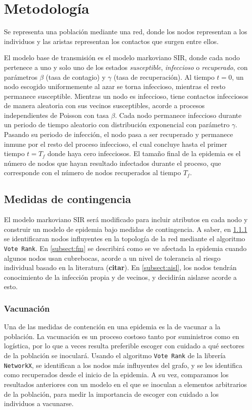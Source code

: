 \chapter{Metodología}\label{ch:method}

Se representa una población mediante una red, donde los nodos representan a los individuos y las aristas representan los contactos que surgen entre ellos. 

El modelo base de transmisión es el modelo markoviano SIR, donde cada nodo pertenece a uno y solo uno de los estados \textit{susceptible}, \textit{infeccioso} o \textit{recuperado}, con parámetros $\beta$ (tasa de contagio) y $\gamma$ (tasa de recuperación). Al tiempo $t = 0$, un nodo escogido uniformemente al azar se torna infeccioso, mientras el resto permanece susceptible. Mientras un nodo es infeccioso, tiene contactos infecciosos de manera aleatoria con sus vecinos susceptibles, acorde a procesos independientes de Poisson con tasa $\beta$. Cada nodo permanece infeccioso durante un periodo de tiempo aleatorio con distribución exponencial con parámetro $\gamma$. Pasando su periodo de infección, el nodo pasa a ser recuperado y permanece inmune por el resto del proceso infeccioso, el cual concluye hasta el primer tiempo $t = T_f$ donde haya cero infecciosos. El tamaño final de la epidemia es el número de nodos que hayan resultado infectados durante el proceso, que corresponde con el número de nodos recuperados al tiempo $T_f$. 

\section{Medidas de contingencia}
El modelo markoviano SIR será modificado para incluir atributos en cada nodo y construir un modelo de epidemia bajo medidas de contingencia.  A saber, en \ref{subsect:vacc} se identificaran nodos influyentes en la topología de la red mediante el algoritmo \texttt{Vote Rank}. En \ref{subsect:fm} se describirá como se ve afectada la epidemia cuando algunos nodos usan cubrebocas, acorde a un nivel de tolerancia al riesgo individual basado en la literatura (\textbf{citar}). En \ref{subsect:aisl}, los nodos tendrán conocimiento de la infección propia y de vecinos, y decidirán aislarse acorde a esto. 

\subsection{Vacunación}\label{subsect:vacc}
Una de las medidas de contención en una epidemia es la de vacunar a la población. La vacunación es un proceso costoso tanto por suministros como en logística, por lo que a veces resulta preferible escoger con cuidado a qué sectores de la población se inoculará. Usando el algoritmo \texttt{Vote Rank} de la librería \texttt{NetworkX}, se identifican a los nodos más influyentes del grafo, y se les identifica como recuperados desde el inicio de la epidemia. 
A su vez, comparamos los resultados anteriores con un modelo en el que se inoculan a elementos arbitrarios de la población, para medir la importancia de escoger con cuidado a los individuos a vacunarse. 


